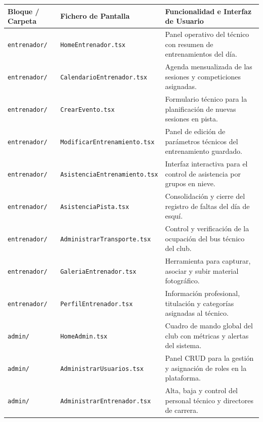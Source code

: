         \begin{table}[htbp]
        \centering
        \scriptsize
        \renewcommand{\arraystretch}{0.95}
        \begin{tabularx}{\textwidth}{|l|l|X|}
        \hline
        \rowcolor[HTML]{EFEFEF} 
        \textbf{Bloque / Carpeta} & \textbf{Fichero de Pantalla} & \textbf{Funcionalidad e Interfaz de Usuario} \\ \hline
        \texttt{entrenador/} & \texttt{HomeEntrenador.tsx} & Panel operativo del técnico con resumen de entrenamientos del día. \\ \hline
        \texttt{entrenador/} & \texttt{CalendarioEntrenador.tsx} & Agenda mensualizada de las sesiones y competiciones asignadas. \\ \hline
        \texttt{entrenador/} & \texttt{CrearEvento.tsx} & Formulario técnico para la planificación de nuevas sesiones en pista. \\ \hline
        \texttt{entrenador/} & \texttt{ModificarEntrenamiento.tsx} & Panel de edición de parámetros técnicos del entrenamiento guardado. \\ \hline
        \texttt{entrenador/} & \texttt{AsistenciaEntrenamiento.tsx} & Interfaz interactiva para el control de asistencia por grupos en nieve. \\ \hline
        \texttt{entrenador/} & \texttt{AsistenciaPista.tsx} & Consolidación y cierre del registro de faltas del día de esquí. \\ \hline
        \texttt{entrenador/} & \texttt{AdministrarTransporte.tsx} & Control y verificación de la ocupación del bus técnico del club. \\ \hline
        \texttt{entrenador/} & \texttt{GaleriaEntrenador.tsx} & Herramienta para capturar, asociar y subir material fotográfico. \\ \hline
        \texttt{entrenador/} & \texttt{PerfilEntrenador.tsx} & Información profesional, titulación y categorías asignadas al técnico. \\ \hline
        \texttt{admin/} & \texttt{HomeAdmin.tsx} & Cuadro de mando global del club con métricas y alertas del sistema. \\ \hline
        \texttt{admin/} & \texttt{AdministrarUsuarios.tsx} & Panel CRUD para la gestión y asignación de roles en la plataforma. \\ \hline
        \texttt{admin/} & \texttt{AdministrarEntrenador.tsx} & Alta, baja y control del personal técnico y directores de carrera. \\ \hline

\end{tabularx}
\end{table}
